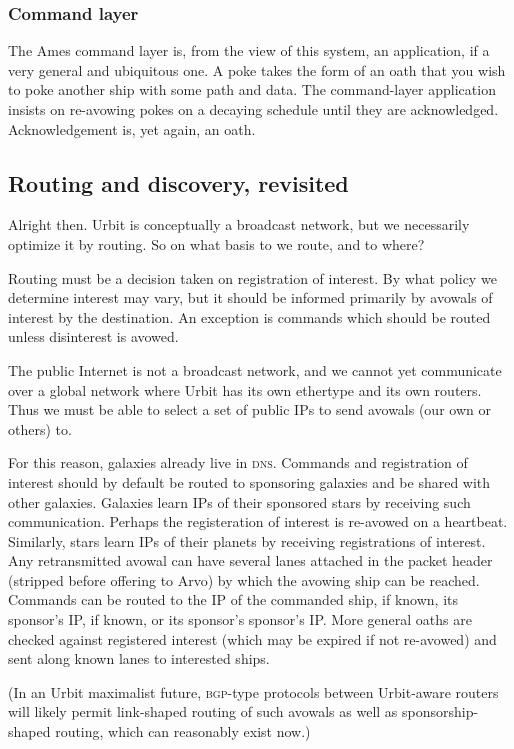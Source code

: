\documentclass[twoside]{article}
\begin{document}
\subsubsection{Command layer}

The Ames command layer is, from the view of this system, an application, if a very general and ubiquitous one. A poke takes the form of an oath that you wish to poke another ship with some path and data. The command-layer application insists on re-avowing pokes on a decaying schedule until they are acknowledged. Acknowledgement is, yet again, an oath.

\subsection{Routing and discovery, revisited}

Alright then. Urbit is conceptually a broadcast network, but we necessarily optimize it by routing. So on what basis to we route, and to where?

Routing must be a decision taken on registration of interest. By what policy we determine interest may vary, but it should be informed primarily by avowals of interest by the destination. An exception is commands which should be routed unless disinterest is avowed.

The public Internet is not a broadcast network, and we cannot yet communicate over a global network where Urbit has its own ethertype and its own routers. Thus we must be able to select a set of public IPs to send avowals (our own or others) to.

For this reason, galaxies already live in \textsc{dns}. Commands and registration of interest should by default be routed to sponsoring galaxies and be shared with other galaxies. Galaxies learn IPs of their sponsored stars by receiving such communication. Perhaps the registeration of interest is re-avowed on a heartbeat. Similarly, stars learn IPs of their planets by receiving registrations of interest. Any retransmitted avowal can have several lanes attached in the packet header (stripped before offering to Arvo) by which the avowing ship can be reached. Commands can be routed to the IP of the commanded ship, if known, its sponsor's IP, if known, or its sponsor's sponsor's IP. More general oaths are checked against registered interest (which may be expired if not re-avowed) and sent along known lanes to interested ships.

(In an Urbit maximalist future, \textsc{bgp}-type protocols between Urbit-aware routers will likely permit link-shaped routing of such avowals as well as sponsorship-shaped routing, which can reasonably exist now.)
\end{document}
